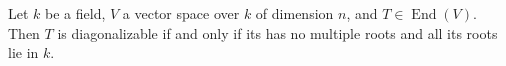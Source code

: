 \documentclass[12pt]{article}
\begin{document}
Let $k$ be a field, $V$ a vector space over $k$ of dimension $n$, 
and $T \in \operatorname{End}(V)$. Then $T$ is diagonalizable if and only if its  has no multiple roots and all its roots lie in $k$.
\end{document}
